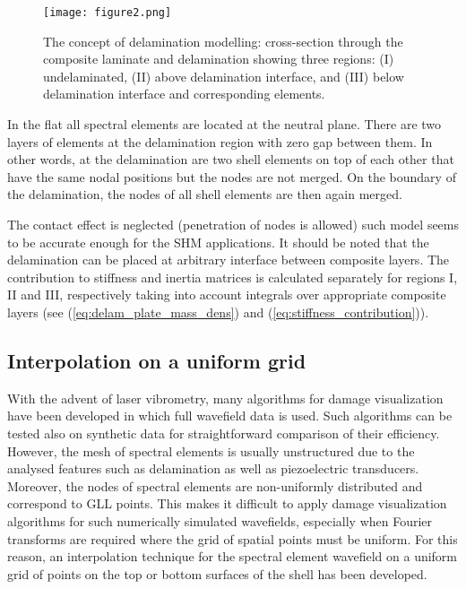 \begin{figure} [h!]
	\centering
\texttt{[image: figure2.png]}	
\caption{The concept of delamination modelling: cross-section through the composite laminate and delamination showing three regions: (I) undelaminated, (II) above delamination interface, and (III) below delamination interface and corresponding elements.}
	\label{fig:delam_modelling_shell}
\end{figure}
In the flat   all spectral elements are located at the neutral plane. There are two layers of elements at the delamination region with zero gap between them. In other words, at the delamination are two shell elements on top of each other that have the same nodal positions but the nodes are not merged. On the boundary of the delamination, the nodes of all shell elements are then again merged.

The contact effect is neglected (penetration of nodes is allowed)   such  model seems to be accurate enough for the SHM applications. It should be noted that the delamination can be placed at  arbitrary interface between composite layers. The contribution to stiffness and inertia matrices is calculated separately for regions I, II and III, respectively taking into account   integrals over appropriate composite layers (see (\ref{eq:delam_plate_mass_dens}) and (\ref{eq:stiffness_contribution})).

\subsection{Interpolation on a uniform grid}

With the advent of laser vibrometry, many algorithms for damage visualization have been developed in which full wavefield data is used. Such algorithms can be tested also on synthetic data for  straightforward comparison of their efficiency. However, the mesh of spectral elements is usually unstructured due to the analysed features such as delamination as well as piezoelectric transducers. Moreover, the nodes of spectral elements are non-uniformly distributed and correspond to GLL points. This makes it difficult to apply damage visualization algorithms for such numerically simulated wavefields, especially when Fourier transforms are required where the grid of spatial points must be uniform. For this reason, an interpolation technique for the spectral element wavefield on a uniform grid of points on the top or bottom surfaces of the shell has been developed. 


